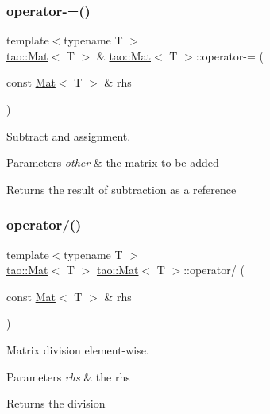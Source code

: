\subsubsection{\texorpdfstring{operator-\/=()}{operator-=()}}
{\footnotesize\ttfamily template$<$typename T $>$ \\
\mbox{\hyperlink{classtao_1_1_mat}{tao\+::\+Mat}}$<$ T $>$ \& \mbox{\hyperlink{classtao_1_1_mat}{tao\+::\+Mat}}$<$ T $>$\+::operator-\/= (\begin{DoxyParamCaption}\item[{const \mbox{\hyperlink{classtao_1_1_mat}{Mat}}$<$ T $>$ \&}]{rhs }\end{DoxyParamCaption})}



Subtract and assignment. 


\begin{DoxyParams}{Parameters}
{\em other} & the matrix to be added \\
\hline
\end{DoxyParams}
\begin{DoxyReturn}{Returns}
the result of subtraction as a reference 
\end{DoxyReturn}
\mbox{\label{classtao_1_1_mat_a0f550cb7daaaf75abe46f3cda97f7df9}} 
\subsubsection{\texorpdfstring{operator/()}{operator/()}\hspace{0.1cm}{\footnotesize\ttfamily [1/2]}}
{\footnotesize\ttfamily template$<$typename T $>$ \\
\mbox{\hyperlink{classtao_1_1_mat}{tao\+::\+Mat}}$<$ T $>$ \mbox{\hyperlink{classtao_1_1_mat}{tao\+::\+Mat}}$<$ T $>$\+::operator/ (\begin{DoxyParamCaption}\item[{const \mbox{\hyperlink{classtao_1_1_mat}{Mat}}$<$ T $>$ \&}]{rhs }\end{DoxyParamCaption})}



Matrix division element-\/wise. 


\begin{DoxyParams}{Parameters}
{\em rhs} & the rhs \\
\hline
\end{DoxyParams}
\begin{DoxyReturn}{Returns}
the division 
\end{DoxyReturn}
\mbox{\label{classtao_1_1_mat_a3dde01988a0bb663e5fbeae1d509eb0c}} 

